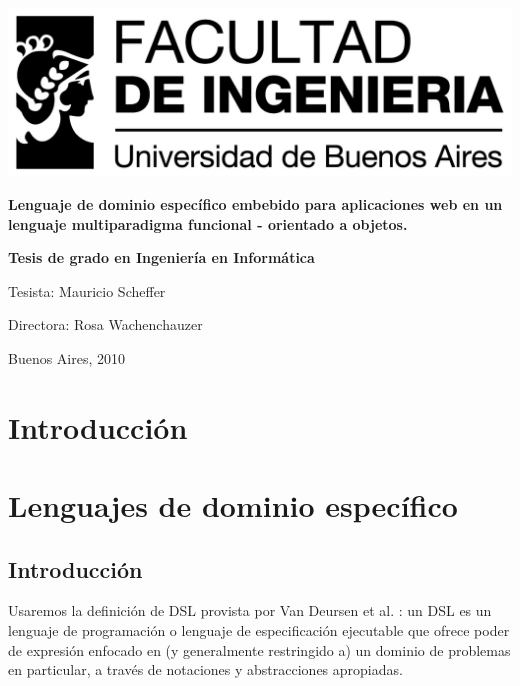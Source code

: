 \documentclass[12pt]{report}
\begin{document}
\thispagestyle{empty}

\begin {center}

\includegraphics[scale=1]{logo_fiuba_alta.jpg}

\vspace{3cm}

\textbf{\LARGE Lenguaje de dominio específico embebido para aplicaciones web en un lenguaje multiparadigma funcional - orientado a objetos.}

\vspace{3cm}

\textbf{\Large Tesis de grado en Ingeniería en Informática}

\vspace{2cm}

\end {center}
\vspace{3cm}

Tesista: Mauricio Scheffer

Directora: Rosa Wachenchauzer

Buenos Aires, 2010

\newpage

\tableofcontents

\newpage

\chapter{Introducci\'on}

\chapter{Lenguajes de dominio espec\'ifico}

\section{Introducci\'on}

Usaremos la definición de DSL provista por Van Deursen et al. \cite{van2000domain}: un DSL es un lenguaje de programación o lenguaje de especificación ejecutable que ofrece poder de expresión enfocado en (y generalmente restringido a) un dominio de problemas en particular, a través de notaciones y abstracciones apropiadas.
\end{document}
